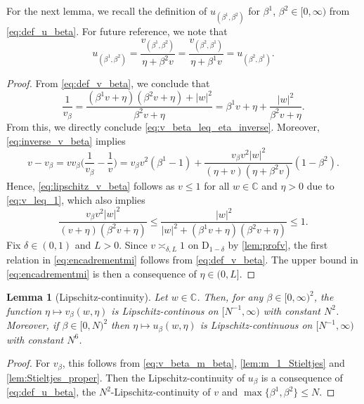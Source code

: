 \documentclass[11pt]{article}
\newcommand{\abs}[1]{\left| #1 \right|}
\newcommand{\C}{\mathbb{C}}
\theoremstyle{plain}
\newtheorem{lemma}{Lemma}[section]
\theoremstyle{remark}
\numberwithin{equation}{section}
\begin{document}
	
	
		For the next lemma, we recall  the definition of $u_{(\beta^1,\beta^2)}$ for $\beta^1$, $\beta^2 \in [0,\infty)$ from \cref{eq:def_u_beta}. 
		For future reference, we note that 
	\begin{equation}\label{eq:def_u_beta2}
		u_{(\beta^1,\beta^2)} = \frac{v_{(\beta^1,\beta^2)}}{\eta + \beta^2 v} = \frac{v_{(\beta^2,\beta^1)}}{\eta + \beta^1 v} = u_{{(\beta^2,\beta^1)}}.
	\end{equation}	
	
\begin{proof}
		From \eqref{eq:def_v_beta}, we conclude that 
		\begin{equation}\label{eq:inverse_v_beta}
			\frac{1}{v_\beta} =\frac{(\beta^1 v + \eta)(\beta^{2}v + \eta) + |w|^{2}}{\beta^{2}v + \eta}= \beta^1 v + \eta + \frac{|w|^2}{\beta^{2}v + \eta}.
		\end{equation}
		From this, we directly conclude \eqref{eq:v_beta_leq_eta_inverse}. 
		Moreover, \eqref{eq:inverse_v_beta} implies 
		\[ v - v_\beta = v v_\beta \bigg( \frac{1}{v_\beta} - \frac{1}{v} \bigg) = v_{\beta} v^2 (\beta^1-1) + 
		\frac{v_\beta v^2\abs{w}^2}{(\eta + v)(\eta + \beta^2 v)}(1-\beta^2). 
		\] 
		Hence, \eqref{eq:lipschitz_v_beta} follows as
		$v\leq 1$ for all $w \in \C$ and $\eta>0$ due to \eqref{eq:v_leq_1}, which also implies 
		\[ 
		\frac{v_\beta v^2 |w|^2}{(v+\eta)\left( \beta^{2}v + \eta \right)} \le \frac{|w|^2}{|w|^2 +  \left(\beta^{1}v+\eta \right) \left(\beta^{2}v+\eta \right)} \le 1. 
		\] 
		Fix $\delta \in (0,1)$ and $L>0$. 
		Since $v\asymp_{\delta,L} 1$ on $\mathrm{D}_{1-\delta}$ by \cref{lem:profv}, the first relation in \eqref{eq:encadrementmi} follows from \eqref{eq:def_v_beta}. The upper bound in \eqref{eq:encadrementmi} is then a 
		consequence of $\eta \in (0,L]$. 
	\end{proof}
	
	
	
	\begin{lemma}[Lipschitz-continuity] \label{lem:v_beta_u_beta_Lipschitz} 
		Let $w \in \C$. Then, for any $\beta \in [0,\infty)^2$, the function $\eta \mapsto v_\beta(w,\eta)$ is Lipschitz-continous on $[N^{-1}, \infty)$ with constant $N^2$. Moreover, if $\beta \in [0,N)^2$ then $\eta \mapsto u_\beta(w,\eta)$ is 
		Lipschitz-continuous on $[N^{-1},\infty)$ with constant $N^6$. 
	\end{lemma} 
	
	\begin{proof} 
	For $v_\beta$, this follows from \cref{eq:v_beta_m_beta}, \cref{lem:m_1_Stieltjes} 
	and \cref{lem:Stieltjes_proper}.  Then the Lipschitz-continuity of $u_\beta$ is 
	a consequence of \cref{eq:def_u_beta}, the $N^2$-Lipschitz-continuity of $v$ and 
	$\max\{\beta^1,\beta^2\} \leq N$. 
	\end{proof} 
	
\end{document}
